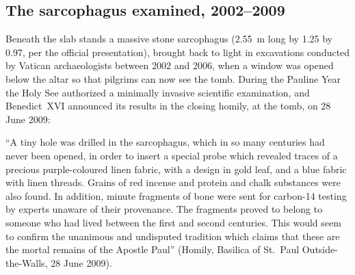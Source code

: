\subsection{The sarcophagus examined, 2002--2009}

Beneath the slab stands a massive stone sarcophagus (2.55~m long by
1.25 by 0.97, per the official presentation), brought back to light in
excavations conducted by Vatican archaeologists between 2002 and 2006,
when a window was opened below the altar so that pilgrims can now see the
tomb. During the Pauline Year the Holy See authorized a minimally invasive
scientific examination, and Benedict~XVI announced its results in the
closing homily, at the tomb, on 28 June 2009:

\begin{studyframe}\small
``A tiny hole was drilled in the sarcophagus, which in so many centuries
had never been opened, in order to insert a special probe which revealed
traces of a precious purple-coloured linen fabric, with a design in gold
leaf, and a blue fabric with linen threads. Grains of red incense and
protein and chalk substances were also found. In addition, minute
fragments of bone were sent for carbon-14 testing by experts unaware of
their provenance. The fragments proved to belong to someone who had lived
between the first and second centuries. This would seem to confirm the
unanimous and undisputed tradition which claims that these are the mortal
remains of the Apostle Paul'' (Homily, Basilica of St.~Paul
Outside-the-Walls, 28 June 2009).
\end{studyframe}

